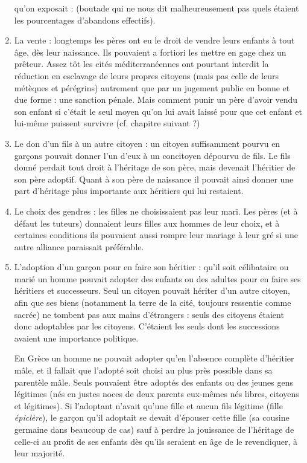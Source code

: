 \begin{enumerate}
qu'on exposait :  (boutade qui ne nous dit malheureusement pas
quels étaient les pourcentages d'abandons effectifs).
\item La vente : longtemps les pères ont eu le droit de vendre leurs
enfants à tout âge, dès leur naissance. Ils pouvaient a fortiori les mettre
en gage chez un prêteur. Assez tôt les cités méditerranéennes ont pourtant
interdit la réduction en esclavage de leurs propres citoyens (mais pas
celle de leurs métèques et pérégrins) autrement que par un jugement public
en bonne et due forme : une sanction pénale. Mais comment punir
un père d'avoir vendu son enfant si c'était le seul moyen qu'on lui avait
laissé pour que cet enfant et lui-même puissent survivre (cf. chapitre suivant ?)
\item Le don d'un fils à un autre citoyen : un citoyen suffisamment
pourvu en garçons pouvait donner l'un d'eux à un concitoyen dépourvu
de fils. Le fils donné perdait tout droit à l'héritage de son père, mais devenait
l'héritier de son père adoptif. Quant à son père de naissance il
pouvait ainsi donner une part d'héritage plus importante aux héritiers qui
lui restaient.
\item Le choix des gendres : les filles ne choisissaient pas leur mari.
Les pères (et à défaut les tuteurs) donnaient leurs filles aux hommes de
leur choix, et à certaines conditions ils pouvaient aussi rompre leur mariage
à leur gré si une autre alliance paraissait préférable.
\item L'adoption d'un garçon pour en faire son héritier : qu'il soit célibataire
ou marié un homme pouvait adopter des enfants ou des adultes
pour en faire ses héritiers et successeurs. Seul un citoyen pouvait hériter
d'un autre citoyen, afin que ses biens (notamment la terre de la cité, toujours
ressentie comme sacrée) ne tombent pas aux mains d'étrangers :
seuls des citoyens étaient donc adoptables par les citoyens. C'étaient les
seuls dont les successions avaient une importance politique.

En Grèce un homme ne pouvait adopter qu'en l'absence complète
d'héritier mâle, et il fallait que l'adopté soit choisi au plus près possible
dans sa parentèle mâle. Seuls pouvaient être adoptés des enfants ou des
jeunes gens légitimes (nés en justes noces de deux parents eux-mêmes
nés libres, citoyens et légitimes). Si l'adoptant n'avait qu'une fille et aucun
fils légitime (fille \emph{épiclère}), le garçon qu'il adoptait se devait d'épouser cette
fille (sa cousine germaine dans beaucoup de cas) sauf à perdre la jouissance
de l'héritage de celle-ci au profit de ses enfants dès qu'ils seraient
en âge de le revendiquer, à leur majorité.


\end{enumerate}
